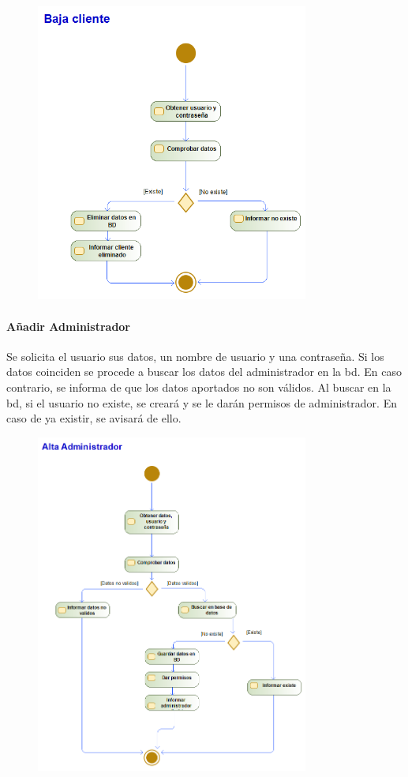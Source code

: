 \begin{figure}[H]
    \centering
    \includegraphics[width=0.8\textwidth]{Use_Cases/baja_cliente.png}
\end{figure}
\newpage
\paragraph{Añadir Administrador}
Se solicita el usuario sus datos, un nombre de usuario y una contraseña. Si los datos coinciden se procede a buscar los datos del administrador en la \gls{bd}. En caso contrario, se informa de que los datos aportados no son válidos. Al buscar en la \gls{bd}, si el usuario no existe, se creará y se le darán permisos de administrador. En caso de ya existir, se avisará de ello.
\begin{figure}[H]
    \centering
    \includegraphics[width=0.8\textwidth]{Use_Cases/alta_admin.png}
\end{figure}
\newpage
